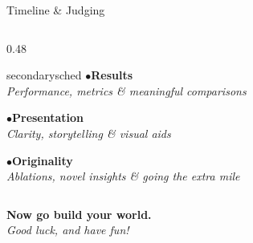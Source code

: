 \documentclass[aspectratio=169]{beamer}
\newcommand{\qitem}[1]{\textcolor{secondary}{\footnotesize$\bullet$}\hspace{4pt}#1\par\vspace{3pt}}
\begin{document}
\begin{frame}{Timeline \& Judging}
\begin{columns}[T]
\begin{column}{0.48\textwidth}
\begin{qbox}{secondary}{sched}
        \qitem{\textbf{Results}\\ \textit{\color{black!60}Performance, metrics \& meaningful comparisons}}
        \vspace{0.15cm}
        
        \qitem{\textbf{Presentation}\\ \textit{\color{black!60}Clarity, storytelling \& visual aids}}
        \vspace{0.15cm}
        
        \qitem{\textbf{Originality}\\ \textit{\color{black!60}Ablations, novel insights \& going the extra mile}}

      \end{qbox}
    \end{column}

  \end{columns}
\end{frame}

\begin{frame}{ }
  \begin{center}
    \vspace{1cm}
    {\color{primary}\Huge\bfseries Now go build your world.}\\[1cm]
    {\large\color{secondary}\itshape Good luck, and have fun!}
  \end{center}
\end{frame}
\end{document}
